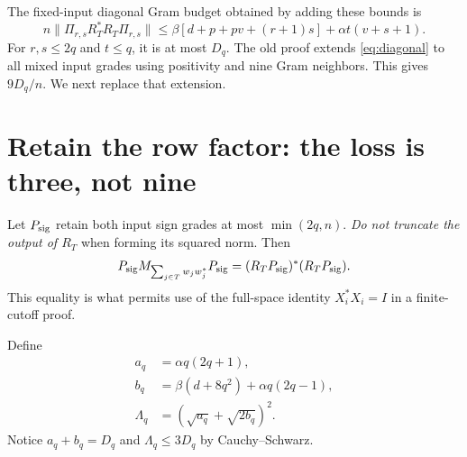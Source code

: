 \documentclass[11pt]{article}
\numberwithin{equation}{section}
\theoremstyle{definition}\newtheorem{definition}[theorem]{Definition}
\theoremstyle{remark}\newtheorem{remark}[theorem]{Remark}
\newcommand{\norm}[1]{\lVert#1\rVert}\newcommand{\ip}[2]{\langle#1,#2\rangle}
\begin{document}
The fixed-input diagonal Gram budget obtained by adding these bounds is
\begin{equation}
 n\norm{\Pi_{r,s}R_T^*R_T\Pi_{r,s}}
 \le\beta[d+p+pv+(r+1)s]+\alpha t(v+s+1).
 \label{eq:diagonal}
\end{equation}
For $r,s\le2q$ and $t\le q$, it is at most $D_q$. The old proof extends \eqref{eq:diagonal} to all mixed input grades using positivity and nine Gram neighbors. This gives $9D_q/n$. We next replace that extension.

\section{Retain the row factor: the loss is three, not nine}
\label{sec:improvement}
Let $P_{\rm sig}$ retain both input sign grades at most $\min(2q,n)$. \emph{Do not truncate the output of $R_T$} when forming its squared norm. Then
\[
 P_{\rm sig}M_{\sum_{j\in T}w_jw_j^*}P_{\rm sig}
       =(R_TP_{\rm sig})^*(R_TP_{\rm sig}).
\]
This equality is what permits use of the full-space identity $X_i^*X_i=I$ in a finite-cutoff proof.

Define
\begin{align}
 a_q&=\alpha q(2q+1),\nonumber\\
 b_q&=\beta(d+8q^2)+\alpha q(2q-1),\nonumber\\
 \Lambda_q&=(\sqrt{a_q}+\sqrt{2b_q})^2.
 \label{eq:Lambda}
\end{align}
Notice $a_q+b_q=D_q$ and $\Lambda_q\le3D_q$ by Cauchy--Schwarz.
\end{document}
